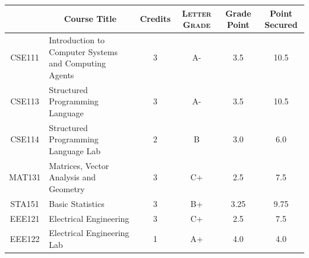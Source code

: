 \documentclass[11pt]{article}
\newcommand*{\numtwo}[1]{\pgfmathprintnumber[
                    fixed, precision=2, fixed zerofill=true]{#1}}
\begin{document}
                \begin{center}
                    \renewcommand{\arraystretch}{1.08}
                    
                \begin{tabular}{|c|l|c|>{\scshape}c|c|c|}
                \hline  \rule[-1ex]{0pt}{3.5ex} {\centering{\bf Course Code}} &  \multicolumn{1}{c|}{\textbf{Course Title}}  & {\bf Credits} & {\bf Letter Grade} & {\bf Grade Point} & {\bf Point Secured}  \\ 
                \hline   CSE111 &  Introduction to Computer Systems and Computing Agents		 & 3 & A- & 3.5 & 10.5 \\ %
                \hline   CSE113 &  Structured Programming Language		 & 3 & A- & 3.5 & 10.5 \\ %
                \hline   CSE114 &  Structured Programming Language Lab		 & 2 & B & 3.0 & 6.0 \\ %
                \hline   MAT131 &  Matrices, Vector Analysis and Geometry		 & 3 & C+ & 2.5 & 7.5 \\ %
                \hline   STA151 &  Basic Statistics		 & 3 & B+ & 3.25 & 9.75 \\ %
                \hline   EEE121 &  Electrical Engineering		 & 3 & C+ & 2.5 & 7.5 \\ %
                \hline   EEE122 &  Electrical Engineering Lab		 & 1 & A+ & 4.0 & 4.0 \\ %

\hline                %
                \end{tabular}
                \end{center}
                \renewcommand{\arraystretch}{1.03}
\end{document}
